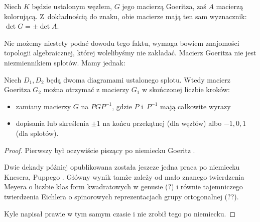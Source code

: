 \begin{proposition}
    Niech $K$ będzie ustalonym węzłem, $G$ jego macierzą Goeritza, zaś $A$ macierzą kolorującą.
    Z~dokładnością do znaku, obie macierze mają ten sam wyznacznik: $\det G = \pm \det A$.
\end{proposition}

Nie możemy niestety podać dowodu tego faktu, wymaga bowiem znajomości topologii algebraicznej, której wolelibyśmy nie zakładać.
Macierz Goeritza nie jest niezmiennikiem splotów.
Mamy jednak:

\begin{proposition}
    Niech $D_1, D_2$ będą dwoma diagramami ustalonego splotu.
    Wtedy macierz Goeritza $G_2$ można otrzymać z macierzy $G_1$ w skończonej liczbie kroków:
    \begin{itemize}
        \item zamiany macierzy $G$ na $PGP^{-1}$, gdzie $P$ i~$P^{-1}$ mają całkowite wyrazy
        \item dopisania lub skreślenia $\pm 1$ na końcu przekątnej (dla węzłów) albo $-1, 0, 1$ (dla splotów).
    \end{itemize}
\end{proposition}

\begin{proof}
%
%
%
%
    Pierwszy był oczywiście piszący po niemiecku Goeritz \cite{goeritz33}.

    Dwie dekady później opublikowana została jeszcze jedna praca po niemiecku Knesera, Puppego \cite{kneser53}.
    Główny wynik tamże zależy od mało znanego twierdzenia Meyera o liczbie klas form kwadratowych w genusie (?) i równie tajemniczego twierdzenia Eichlera o spinorowych reprezentacjach grupy ortogonalnej (??).

    Kyle napisał prawie w tym samym czasie \cite{kyle54} i nie zrobił tego po niemiecku.
\end{proof}


